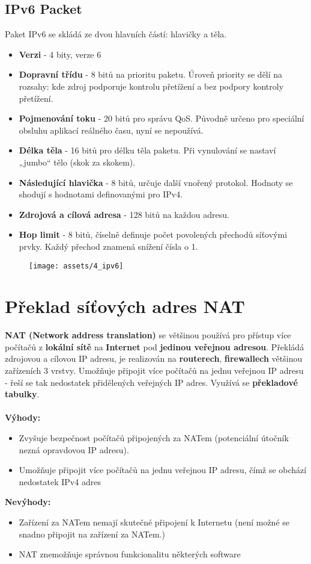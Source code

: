 \subsection{IPv6 Packet}
Paket IPv6 se skládá ze dvou hlavních částí: hlavičky a těla.
\begin{itemize}
    \item \textbf{Verzi} - 4 bity, verze 6
    \item \textbf{Dopravní třídu} - 8 bitů na prioritu paketu. Úroveň priority se dělí na rozsahy: kde zdroj podporuje kontrolu přetížení a bez podpory kontroly přetížení.
    \item \textbf{Pojmenování toku} - 20 bitů pro správu QoS. Původně určeno pro speciální obsluhu aplikací reálného času, nyní se nepoužívá.
    \item \textbf{Délka těla} - 16 bitů pro délku těla paketu. Při vynulování se nastaví „jumbo“ tělo (skok za skokem).
    \item \textbf{Následující hlavička} - 8 bitů, určuje další vnořený protokol. Hodnoty se shodují s hodnotami definovanými pro IPv4.
    \item \textbf{Zdrojová a cílová adresa} - 128 bitů na každou adresu.
    \item\textbf{Hop limit }- 8 bitů, číselně definuje počet povolených přechodů síťovými prvky. Každý přechod znamená snížení čísla o 1.
\end{itemize}

\begin{figure}[H]
    \centering
    \texttt{[image: assets/4\_ipv6]}
\end{figure}


\section{Překlad síťových adres NAT}
\textbf{NAT (Network address translation)} se většinou používá pro přístup více počítačů z \textbf{lokální sítě} na \textbf{Internet} pod \textbf{jedinou veřejnou adresou}. Překládá zdrojovou a cílovou IP adresu, je realizován na \textbf{routerech}, \textbf{firewallech} většinou zařízeních 3 vrstvy. Umožňuje připojit více počítačů na jednu veřejnou IP adresu - řeší se tak nedostatek přidělených veřejných IP adres. Využívá se \textbf{překladové tabulky}.
\\\\
\textbf{Výhody:}
\begin{itemize}
    \item Zvyšuje bezpečnost počítačů připojených za NATem (potenciální útočník nezná opravdovou IP adresu).
    \item Umožňuje připojit více počítačů na jednu veřejnou IP adresu, čímž se obchází nedostatek IPv4 adres
\end{itemize}
\textbf{Nevýhody:}
\begin{itemize}
    \item Zařízení za NATem nemají skutečné připojení k Internetu (není možné se snadno připojit na zařízení za NATem.)
    \item NAT znemožňuje správnou funkcionalitu některých software
\end{itemize}

